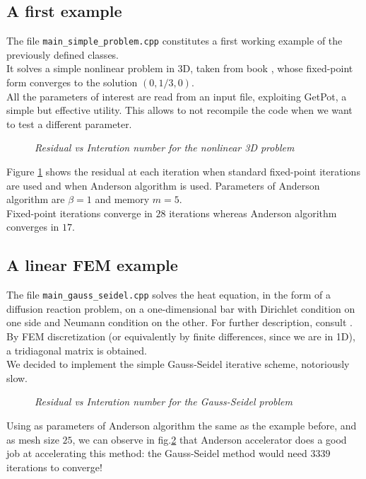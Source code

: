 \documentclass[12pt]{article}
\begin{document}
		\subsection{A first example}
			The file \verb|main_simple_problem.cpp| constitutes a first working example of the previously defined classes.\\
			It solves a simple nonlinear problem in 3D, taken from book \cite{Quarteroni}, whose fixed-point form converges to
			the solution $(0,1/3,0)$.\\
			All the parameters of interest are read from an input file, exploiting GetPot, a simple but effective utility.
			This allows to not recompile the code when we want to test a different parameter.
			
			\begin{figure}
			{\scriptsize
			}
			\centering
			\caption{\textit{Residual vs Interation number for the nonlinear 3D problem}}
			\label{fig:simple}
			\end{figure}
			
			Figure \ref{fig:simple} shows the residual at each iteration when standard fixed-point iterations are used 
			and when Anderson algorithm is used. Parameters of Anderson algorithm are $\beta=1$ and memory $m=5$.\\
			Fixed-point iterations converge in $28$ iterations whereas Anderson algorithm converges in $17$.
			
		\subsection{A linear FEM example}
			The file \verb|main_gauss_seidel.cpp| solves the heat equation, in the form of a diffusion
			reaction problem, on a one-dimensional bar with Dirichlet condition on one side and Neumann condition on the other.
			For further description, consult \cite{Formaggia}.\\
			By FEM discretization (or equivalently by finite differences, since we are in 1D), a tridiagonal matrix is obtained.\\
			We decided to implement the simple Gauss-Seidel iterative scheme, notoriously slow.
			\begin{figure}
			{\scriptsize
			}
			\centering
			\caption{\textit{Residual vs Interation number for the Gauss-Seidel problem}}
			\label{fig:Gauss}
			\end{figure}
			Using as parameters of Anderson algorithm the same as the example before, and as mesh size $25$, we can observe in fig.\ref{fig:Gauss} that Anderson
			accelerator does a good job at accelerating this method: the Gauss-Seidel method would need $3339$ iterations
			to converge!
			
\end{document}
